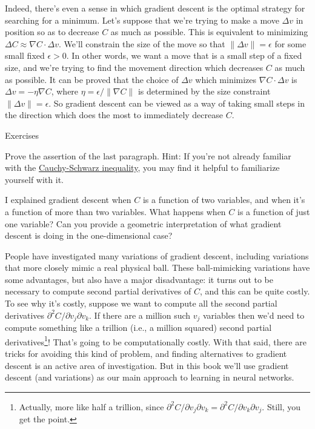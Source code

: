\documentclass[a4paper,twoside,10pt]{book}
\begin{document}
Indeed, there's even a sense in which gradient descent is the optimal strategy for searching for a minimum. Let's suppose that we're trying to make a move $\Delta v$ in position so as to decrease $C$ as much as possible. This is equivalent to minimizing $\Delta C \approx \nabla C \cdot \Delta v$. We'll constrain the size of the move so that $\|\Delta v\| = \epsilon$ for some small fixed $\epsilon > 0$. In other words, we want a move that is a small step of a fixed size, and we're trying to find the movement direction which decreases $C$ as much as possible. It can be proved that the choice of $\Delta v$ which minimizes $\nabla C \cdot \Delta v$ is $\Delta v = - \eta \nabla C$, where $\eta = \epsilon / \|\nabla C\|$ is determined by the size constraint $\|\Delta v\| = \epsilon$. So gradient descent can be viewed as a way of taking small steps in the direction which does the most to immediately decrease $C$.

\begin{exercize}{Exercises}
\item Prove the assertion of the last paragraph. Hint: If you're not already familiar with the \href{http://en.wikipedia.org/wiki/Cauchy\%E2\%80\%93Schwarz_inequality}{Cauchy-Schwarz inequality}, you may find it helpful to familiarize yourself with it.
\item I explained gradient descent when $C$ is a function of two variables, and when it's a function of more than two variables. What happens when $C$ is a function of just one variable? Can you provide a geometric interpretation of what gradient descent is doing in the one-dimensional case?
\end{exercize}

People have investigated many variations of gradient descent, including variations that more closely mimic a real physical ball. These ball-mimicking variations have some advantages, but also have a major disadvantage: it turns out to be necessary to compute second partial derivatives of $C$, and this can be quite costly. To see why it's costly, suppose we want to compute all the second partial derivatives $\partial^2 C/ \partial v_j \partial v_k$. If there are a million such $v_j$ variables then we'd need to compute something like a trillion (i.e., a million squared) second partial derivatives\footnote{Actually, more like half a trillion, since $\partial^2 C/ \partial v_j \partial v_k = \partial^2 C/ \partial v_k \partial v_j$. Still, you get the point.}! That's going to be computationally costly. With that said, there are tricks for avoiding this kind of problem, and finding alternatives to gradient descent is an active area of investigation. But in this book we'll use gradient descent (and variations) as our main approach to learning in neural networks.
\end{document}
